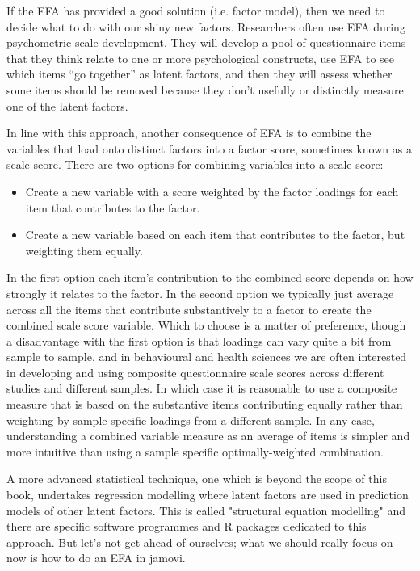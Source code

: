 
If the EFA has provided a good solution (i.e. factor model), then we need to decide what to do with our shiny new factors. Researchers often use EFA during psychometric scale development. They will develop a pool of questionnaire items that they think relate to one or more psychological constructs, use EFA to see which items “go together” as latent factors, and then they will assess whether some items should be removed because they don't usefully or distinctly measure one of the latent factors. 

In line with this approach, another consequence of EFA is to combine the variables that load onto distinct factors into a factor score, sometimes known as a scale score. There are two options for combining variables into a scale score:

\begin{itemize} \itemsep -2pt
\item Create a new variable with a score weighted by the factor loadings for each item that contributes to the factor. 
\item Create a new variable based on each item that contributes to the factor, but weighting them equally. 
\end{itemize}

In the first option each item’s contribution to the combined score depends on how strongly it relates to the factor. In the second option we typically just average across all the items that contribute substantively to a factor to create the combined scale score variable. Which to choose is a matter of preference, though a disadvantage with the first option is that loadings can vary quite a bit from sample to sample, and in behavioural and health sciences we are often interested in developing and using composite questionnaire scale scores across different studies and different samples. In which case it is reasonable to use a composite measure that is based on the substantive items contributing equally rather than weighting by sample specific loadings from a different sample. In any case, understanding a combined variable measure as an average of items is simpler and more intuitive than using a sample specific optimally-weighted combination.

A more advanced statistical technique, one which is beyond the scope of this book, undertakes regression modelling where latent factors are used in prediction models of other latent factors. This is called "structural equation modelling" and there are specific software programmes and R packages dedicated to this approach. But let's not get ahead of ourselves; what we should really focus on now is how to do an EFA in jamovi.  


